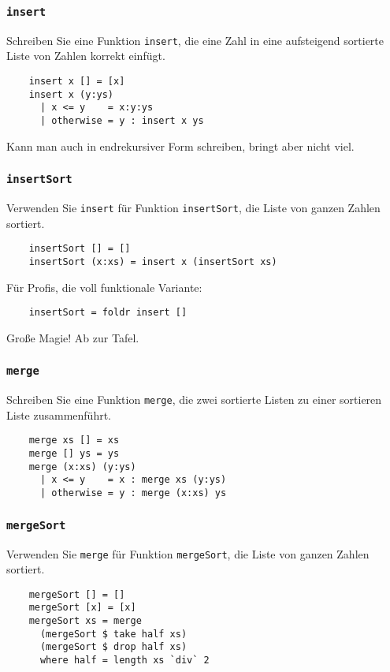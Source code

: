 \documentclass{beamer}
\begin{document}
\begin{frame}[fragile]
  \frametitle{\lstinline{insert}}
  Schreiben Sie eine Funktion \lstinline{insert}, die eine Zahl in eine aufsteigend sortierte Liste von Zahlen korrekt einfügt.
  \pause
  \begin{lstlisting}
    insert x [] = [x]
    insert x (y:ys)
      | x <= y    = x:y:ys
      | otherwise = y : insert x ys
  \end{lstlisting}
  Kann man auch in endrekursiver Form schreiben, bringt aber nicht viel.
\end{frame}

\begin{frame}[fragile]
  \frametitle{\lstinline{insertSort}}
  Verwenden Sie \lstinline{insert} für Funktion \lstinline{insertSort}, die Liste von ganzen Zahlen sortiert.
  \pause
  \begin{lstlisting}
    insertSort [] = []
    insertSort (x:xs) = insert x (insertSort xs)
  \end{lstlisting}
  \pause
  Für Profis, die voll funktionale Variante:
  \pause
  \begin{lstlisting}
    insertSort = foldr insert []
  \end{lstlisting}
  Große Magie! Ab zur Tafel.
\end{frame}

\begin{frame}[fragile]
  \frametitle{\lstinline{merge}}
  Schreiben Sie eine Funktion \lstinline{merge}, die zwei sortierte Listen zu einer sortieren Liste zusammenführt.
  \pause
  \begin{lstlisting}
    merge xs [] = xs
    merge [] ys = ys
    merge (x:xs) (y:ys)
      | x <= y    = x : merge xs (y:ys)
      | otherwise = y : merge (x:xs) ys
  \end{lstlisting}
\end{frame}

\begin{frame}[fragile]
  \frametitle{\lstinline{mergeSort}}
  Verwenden Sie \lstinline{merge} für Funktion \lstinline{mergeSort}, die Liste von ganzen Zahlen sortiert.
  \pause
  \begin{lstlisting}
    mergeSort [] = []
    mergeSort [x] = [x]
    mergeSort xs = merge
      (mergeSort $ take half xs)
      (mergeSort $ drop half xs)
      where half = length xs `div` 2
  \end{lstlisting}
\end{frame}
\end{document}
